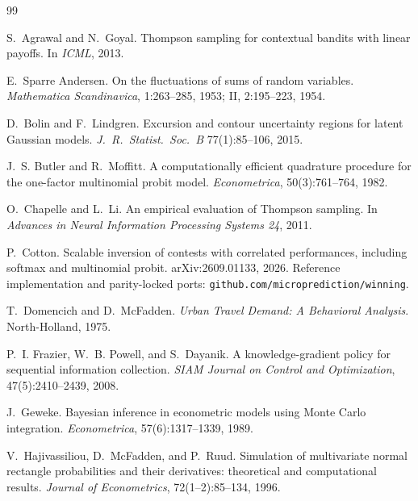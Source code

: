 \documentclass[11pt]{article}
\begin{document}
\begin{thebibliography}{99}

 S.~Agrawal and
N.~Goyal. Thompson sampling for contextual bandits with linear
payoffs. In \emph{ICML}, 2013.

 E.~Sparre Andersen. On the
fluctuations of sums of random variables. \emph{Mathematica
Scandinavica}, 1:263--285, 1953; II, 2:195--223, 1954.

 D.~Bolin and
F.~Lindgren. Excursion and contour uncertainty regions for latent
Gaussian models. \emph{J.\ R.\ Statist.\ Soc.\ B} 77(1):85--106,
2015.

 J.~S. Butler and
R.~Moffitt. A computationally efficient quadrature procedure for the
one-factor multinomial probit model. \emph{Econometrica},
50(3):761--764, 1982.

 O.~Chapelle and L.~Li.
An empirical evaluation of Thompson sampling. In \emph{Advances in
Neural Information Processing Systems 24}, 2011.

 P.~Cotton. Scalable inversion of
contests with correlated performances, including softmax and
multinomial probit. arXiv:2609.01133, 2026. Reference implementation
and parity-locked ports: \texttt{github.com/microprediction/winning}.

 T.~Domencich
and D.~McFadden. \emph{Urban Travel Demand: A Behavioral Analysis}.
North-Holland, 1975.

P.~I. Frazier, W.~B. Powell, and S.~Dayanik. A knowledge-gradient
policy for sequential information collection. \emph{SIAM Journal on
Control and Optimization}, 47(5):2410--2439, 2008.

 J.~Geweke. Bayesian inference in
econometric models using Monte Carlo integration. \emph{Econometrica},
57(6):1317--1339, 1989.

 V.~Hajivassiliou, D.~McFadden, and P.~Ruud.
Simulation of multivariate normal rectangle probabilities and their
derivatives: theoretical and computational results. \emph{Journal of
Econometrics}, 72(1--2):85--134, 1996.


\end{thebibliography}
\end{document}
